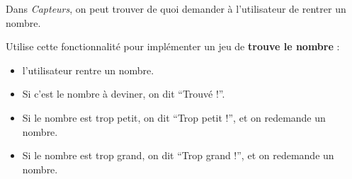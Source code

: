 \documentclass[a4paper,11pt]{article}
\begin{document}
\begin{exercice*}
	Dans \textit{Capteurs}, on peut trouver de quoi demander à l'utilisateur de rentrer un nombre.

	Utilise cette fonctionnalité pour implémenter un jeu de \textbf{trouve le nombre} :
	\begin{itemize}
		\item l'utilisateur rentre un nombre.
		\item Si c'est le nombre à deviner, on dit “Trouvé !”.
		\item Si le nombre est trop petit, on dit “Trop petit !”, et on redemande un nombre.
		\item Si le nombre est trop grand, on dit “Trop grand !”, et on redemande un nombre.
	\end{itemize}
\end{exercice*}
\end{document}
